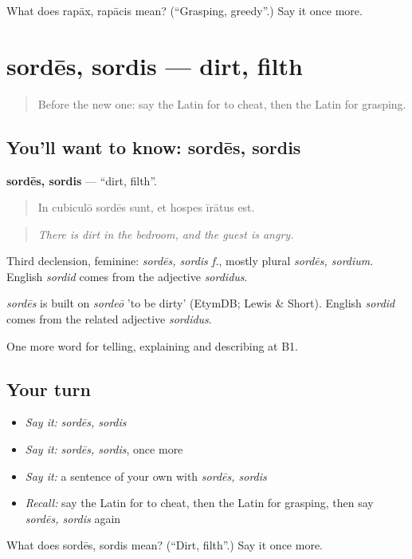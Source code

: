 \begin{tcolorbox}[breakable,colback=teal!4,colframe=teal!35!black,title={Before you move on}]
What does rapāx, rapācis mean? (\textquotedblleft{}Grasping, greedy\textquotedblright{}.) Say it once more.
\end{tcolorbox}
\section[sordēs, sordis]{sordēs, sordis — dirt, filth}

\label{lesson:LA-C450-sordes}



\begin{quote}
Before the new one: say the Latin for to cheat, then the Latin for grasping.
\end{quote}

\subsection*{You'll want to know: sordēs, sordis}
\textbf{sordēs, sordis} — \textquotedblleft{}dirt, filth\textquotedblright{}.

\begin{quote}
In cubiculō sordēs sunt, et hospes īrātus est.
\end{quote}

\begin{quote}
\emph{There is dirt in the bedroom, and the guest is angry.}
\end{quote}

Third declension, feminine: \emph{sordēs, sordis f.}, mostly plural \emph{sordēs, sordium}. English \emph{sordid} comes from the adjective \emph{sordidus}.

\begin{cousinweb}
\emph{sordēs} is built on \emph{sordeō} 'to be dirty' (EtymDB; Lewis \& Short). English \emph{sordid} comes from the related adjective \emph{sordidus}.
\end{cousinweb}

\begin{grammarlens}[title={What you've built}]
One more word for telling, explaining and describing at B1.
\end{grammarlens}

\subsection*{Your turn}
\begin{itemize}
\raggedright
  \item \emph{Say it:} \emph{sordēs, sordis}
  \item \emph{Say it:} \emph{sordēs, sordis}, once more
  \item \emph{Say it:} a sentence of your own with \emph{sordēs, sordis}
  \item \emph{Recall:} say the Latin for to cheat, then the Latin for grasping, then say \emph{sordēs, sordis} again
\end{itemize}

\begin{tcolorbox}[breakable,colback=teal!4,colframe=teal!35!black,title={Before you move on}]
What does sordēs, sordis mean? (\textquotedblleft{}Dirt, filth\textquotedblright{}.) Say it once more.
\end{tcolorbox}
